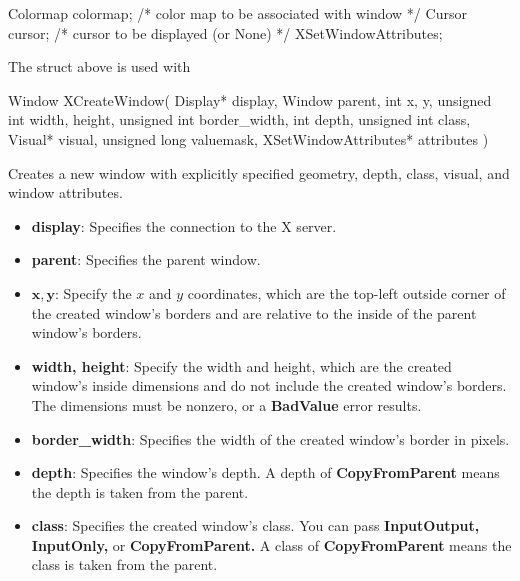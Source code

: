 \documentclass{report}
\begin{document}
\begin{itemize}
\begin{cppcode}
{                    Colormap colormap;              /* color map to be associated with window */
                    Cursor cursor;                  /* cursor to be displayed (or None) */
                } XSetWindowAttributes;
            \end{cppcode}
            \bigbreak \noindent 
            The struct above is used with 
            \bigbreak \noindent 
            \begin{cppcode}
                Window XCreateWindow(
                    Display* display, 
                    Window parent,
                    int x, y, 
                    unsigned int width, height, 
                    unsigned int border_width,
                    int depth,
                    unsigned int class,
                    Visual* visual,
                    unsigned long valuemask,
                    XSetWindowAttributes* attributes
                )
            \end{cppcode}
            \bigbreak \noindent 
            Creates a new window with explicitly specified geometry, depth, class, visual, and window attributes.
            \begin{itemize}
                \item \textbf{display}: Specifies the connection to the X server.
                \item \textbf{parent}: Specifies the parent window.
                \item \textbf{$\mathbf{x}, \mathbf{y}$}: Specify the $x$ and $y$ coordinates, which are the top-left outside corner of the created window’s borders and are relative to the inside of the parent window’s borders.
                \item \textbf{width, height}: Specify the width and height, which are the created window’s inside dimensions and do not include the created window’s borders. The dimensions must be nonzero, or a \textbf{BadValue} error results.
                \item \textbf{border\_width}: Specifies the width of the created window’s border in pixels.
                \item \textbf{depth}: Specifies the window’s depth. A depth of \textbf{CopyFromParent} means the depth is taken from the parent.
                \item \textbf{class}: Specifies the created window’s class. You can pass \textbf{InputOutput,} \textbf{InputOnly,} or \textbf{CopyFromParent.} A class of \textbf{CopyFromParent} means the class is taken from the parent.

\end{itemize}
\end{itemize}
\end{document}
